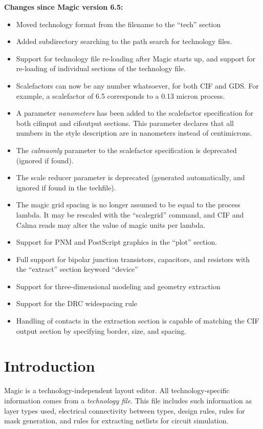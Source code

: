 \documentclass[letterpaper,twoside,12pt]{article}
\begin{document}
{\noindent\bfseries\large Changes since Magic version 6.5:}
\begin{itemize}
\item Moved technology format from the filename to the ``tech'' section
\item Added subdirectory searching to the path search for technology files.
\item Support for technology file re-loading after Magic starts up, and
	support for re-loading of individual sections of the technology
	file.
\item Scalefactors can now be any number whatsoever, for both CIF and GDS.
	For example, a scalefactor of 6.5 corresponds to a 0.13 micron
	process.
\item A parameter {\itshape nanometers} has been added to the scalefactor
	specification for both cifinput and cifoutput sections.  This
	parameter declares that all numbers in the style description are
	in nanometers instead of centimicrons.
\item The {\itshape calmaonly} parameter to the scalefactor specification is
	deprecated (ignored if found).
\item The scale reducer parameter is deprecated (generated automatically,
	and ignored if found in the techfile).
\item The magic grid spacing is no longer assumed to be equal to the process
	lambda.  It may be rescaled with the ``scalegrid'' command, and CIF
	and Calma reads may alter the value of magic units per lambda.
\item Support for PNM and PostScript graphics in the ``plot'' section.
\item Full support for bipolar junction transistors, capacitors, and
	resistors with the ``extract'' section keyword ``device''
\item Support for three-dimensional modeling and geometry extraction
\item Support for the DRC widespacing rule
\item Handling of contacts in the extraction section is capable of
	matching the CIF output section by specifying border, size,
	and spacing.
\end{itemize}

\vspace*{0.25in}
\section{Introduction}

Magic is a technology-independent layout editor.
All technology-specific information comes from a
{\itshape technology file}.  This file includes such information
as layer types used, electrical connectivity between types,
design rules, rules for mask generation, and rules for
extracting netlists for circuit simulation.
\end{document}
